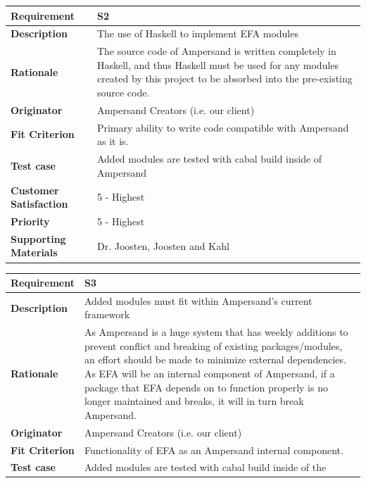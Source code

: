 \documentclass[12pt]{report}
\begin{document}
{%
{\setlength{\tabcolsep}{6pt} %
    \begin{tabularx}{\textwidth}{>{\bfseries}m{3cm}X}
        Requirement & S2 \\ 
        \midrule
        \endhead
        Description  & The use of Haskell to implement EFA modules
        \\	Rationale & The source code of Ampersand is written completely in 
        Haskell, and thus Haskell must be used for any modules created by this 
        project to be absorbed into the pre-existing source code.
        \\	Originator & Ampersand Creators (i.e. our client)        
        \\	Fit Criterion & Primary ability to write code compatible with 
        Ampersand as it is.
        \\ Test case & Added modules are tested with cabal build inside of 
        Ampersand
        \\	Customer Satisfaction & 5 - Highest 
        \\	Priority & 5 - Highest 
        \\	Supporting Materials & Dr. Joosten, Joosten and Kahl
        \vspace{12pt}
    \end{tabularx}
}
{\setlength{\tabcolsep}{6pt} %
    \begin{tabularx}{\textwidth}{>{\bfseries}m{3cm}X}
        Requirement & S3 \\ 
        \midrule
        \endhead
        Description  & Added modules must fit within Ampersand's current 
        framework
        \\	Rationale & As Ampersand is a huge system that has weekly additions 
        to prevent conflict and breaking of existing packages/modules, an 
        effort should be made to minimize external dependencies. As EFA will be 
        an internal component of Ampersand, if a package that EFA depends on to 
        function properly is no longer maintained and breaks, it will in turn 
        break Ampersand.
        \\	Originator & Ampersand Creators (i.e. our client)        
        \\	Fit Criterion & Functionality of EFA as an Ampersand internal 
        component.
        \\ Test case & Added modules are tested with cabal build inside of the

\end{tabularx}}}
\end{document}
